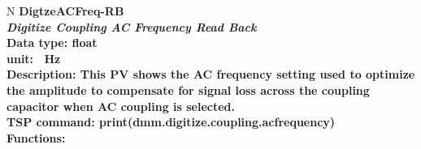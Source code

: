 \documentclass[openany]{article}
\begin{document}
		\begin{tabular}{N}
			\hline
			\bfseries DigtzeACFreq-RB\label{pv:digtzeacfreq-rb} \\ \hline
			\emph{Digitize Coupling AC Frequency Read Back} \\
			Data type: float \\
			unit: \SI{}{\hertz} \\
			Description: This PV shows the AC frequency setting used to optimize the amplitude to compensate for signal loss across the coupling capacitor when AC coupling is selected. \\
			TSP command: print(dmm.digitize.coupling.acfrequency) \\
			Functions: \\
			\arrayrulecolor{\FuncTableBorderColor}

		\end{tabular}
\end{document}
